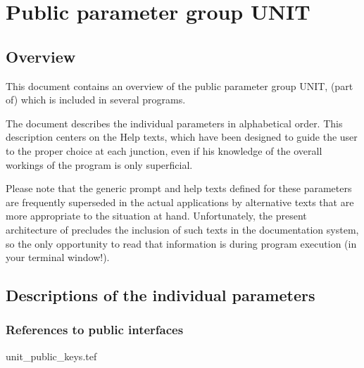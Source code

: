 
\chapter{ Public parameter group UNIT}
\tableofcontents


\section{ Overview}

	This document contains an overview of the public parameter group UNIT,
(part of) which is included in several \NEWSTAR programs.



	The
document describes the individual parameters in alphabetical order. This
description centers on the Help texts, which have been designed to guide the
user to the proper choice at each junction, even if his knowledge of the
overall workings of the program is only superficial.

	Please note that the generic prompt and help texts defined for these
parameters are frequently superseded in the actual applications by alternative
texts that are more appropriate to the situation at hand. Unfortunately, the
present architecture of \NEWSTAR precludes the inclusion of such texts in the
documentation system, so the only opportunity to read that information is
during program execution (in your terminal window!).


\section{ Descriptions of the individual parameters}
\label{.descriptions}

\subsection{ References to public interfaces}
\label{.public}

 {unit_public_keys.tef}
